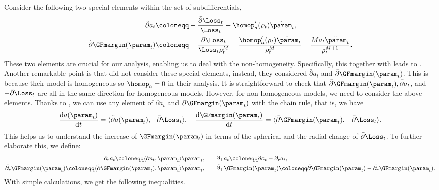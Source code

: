 Consider the following two special elements within the set of subdifferentials,
\begin{align}
\label{eq:tilde-partial-margin-GD}
\tilde \partial a_t 
&\coloneqq - \frac{ \bar \partial \Loss_t}{\Loss_t } - {\homop_a^\prime (\rho_t) \tilde \param_t}, \\
\tilde \partial \GFmargin(\param_t) 
&\coloneqq - \frac{ \bar \partial \Loss_t}{\Loss_t \rho_t^M} - \frac{\homop_a^\prime (\rho_t) \tilde \param_t}{\rho_t^M} - \frac{Ma_t \tilde \param_t}{\rho_t^{M+1}}. 
\end{align}
These two elements are crucial for our analysis, enabling us to deal with the non-homogeneity. 
Specifically, this together with  leads to . Another remarkable point is that \citet{ji2020directional} did not consider these special elements, instead, they considered $\bar \partial a_t$ and $\bar \partial \GFmargin(\param_t)$. 
This is because their model is homogeneous so $\homop_a=0$ in their analysis. 
It is straightforward to check that $\bar \partial \GFmargin(\param_t), \bar \partial a_t$, and $ - \bar \partial \Loss_t$ are all in the same direction for homogeneous models. 
However, for non-homogeneous models, we need to consider the above elements. 
Thanks to , we can use any element of $\partial a_t$ and $\partial \GFmargin(\param_t)$ with the chain rule, that is, we have
\[
   \frac{\mathrm{d}  a(\param_t)}{\mathrm{d}  t} = \langle \tilde \partial a(\param_t), - \bar \partial \Loss_t \rangle, \quad \frac{\mathrm{d}  \GFmargin(\param_t)}{\mathrm{d}  t} = \langle \tilde \partial \GFmargin(\param_t), - \bar \partial \Loss_t \rangle.
\]
This helps us to understand the increase of $\GFmargin(\param_t)$ in terms of the spherical and the radial change of $\bar \partial \Loss_t$.  To further elaborate this, we define: 
\begin{align}
\label{eq:tilde-radial-perp-margin-GD}
\tilde \partial_r a_t \coloneqq \langle \tilde \partial a_t, \tilde \param_t \rangle \tilde \param_t, 
&\quad \quad \tilde \partial_\perp a_t \coloneqq \tilde \partial a_t - \tilde \partial_r a_t,
\\ 
\tilde \partial_r \GFmargin(\param_t) \coloneqq \langle \tilde \partial \GFmargin(\param_t), \tilde \param_t \rangle \tilde \param_t, 
&\quad \quad \tilde \partial_\perp \GFmargin(\param_t) \coloneqq \tilde \partial \GFmargin(\param_t) - \tilde \partial_r \GFmargin(\param_t).
\end{align}
With simple calculations, we get the following inequalities.

